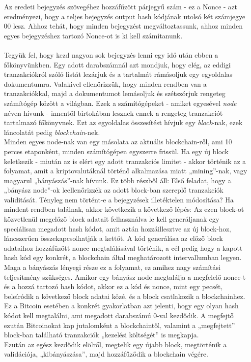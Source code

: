 \documentclass[11pt,a4paper]{article}
\newcommand{\q}[1]{„#1''} %
\begin{document}
\noindent Az eredeti bejegyzés szövegéhez hozzáfűzött párjegyű szám - ez a Nonce - azt eredményezi, hogy a teljes bejegyzés output hash kódjának utolsó két számjegye 00 lesz. Ahhoz tehát, hogy minden bejegyzést megváltoztassunk, ahhoz minden egyes bejegyzéshez tartozó Nonce-ot is ki kell számítanunk.
\\ \\
Tegyük fel, hogy kezd nagyon sok bejegyzés lenni egy idő után ebben a főkönyvünkben. Egy adott darabszámnál azt mondjuk, hogy elég, az eddigi tranzakciókról szóló listát lezárjuk és a tartalmát rámásoljuk egy egyoldalas dokumentumra. Valakivel ellenőrizzük, hogy minden rendben van a tranzakciókkal, majd a dokumentumot lemásoljuk és szétszórjuk rengeteg számítógép között a világban. Ezek a számítógépeket - amiket egyesével \textit{node} néven hívunk - innentől birtokában lesznek ennek a rengeteg tranzakciót tartalmazó főkönyvnek. Ezt az egyoldalas összesítést hívjuk egy \textit{block}-nak, ezek láncolatát pedig \textit{blockchain}-nek. \\
Minden egyes node-nak van egy másolata az aktuális blockchain-ről, ami 10 perces etaponként, minden számítógépen egyszerre frissül. Ha egy új block keletkezik - miután az is elért egy adott tranzakciós limitet - akkor történik az a folyamat, amit a kriptovalutáknál történő alkalmazása miatt \q{mining}-nak, vagy magyarul \q{bányászás}-nak hívunk. Ez több részből áll: Első feladat, hogy a \q{bányász node}-ok leellenőrizzék az adott block-ban szereplő tranzakciók validitását. Tényleg nem történt-e a bejegyzések illetéktelen módosítása? Ha mindent rendben találnak, akkor következik a következő lépés: Az ezen block-ot közvetlenül megelőző block adatait felhasználva le kell generáljanak egy speciálisan megadott hash kódot, amit aztán hozzáillesztve az új block-hoz, láncszerűen összekapcsolhatják a kettőt. A kód generálása az előző block adataihoz hozzáfűzött nonce megtalálásával történik, a cél pedig hogy a kapott hash kód egy konkrét, a blockchain által meghatározott intervallumban legyen. Maga a bányászás lényegi része ez a folyamat, ez amihez nagy számítási teljesítmény szükséges. Amikor egy bányász node megtalálja a megfelelő nonce-t és a hozzá tartozó hash kódot, akkor ez a kód és nonce, mint egy pecsét, beleíródik a következő block adatai közé, és a block csatlakozik a blockchainhez. Ez a Bitcoin esetében a konkrét gyakorlatban azt jelenti, hogy egy olyan hash kódot kell megtalálni, ami megadott darabszámú 0-val kezdődik. A megfejtő ezután Bitcoinokat kap jutalomként a blockchaintől, valamint a \q{megfejtett} block-ban található tranzakciók \q{kezelési költségét} is megkapja. \\
Ezután az egész kezdődik elölről, megtelik egy újabb block, megtörténik a validációja, \q{kibányászása}, majd hozzáfűződik a blockchain végére. \\
\end{document}
